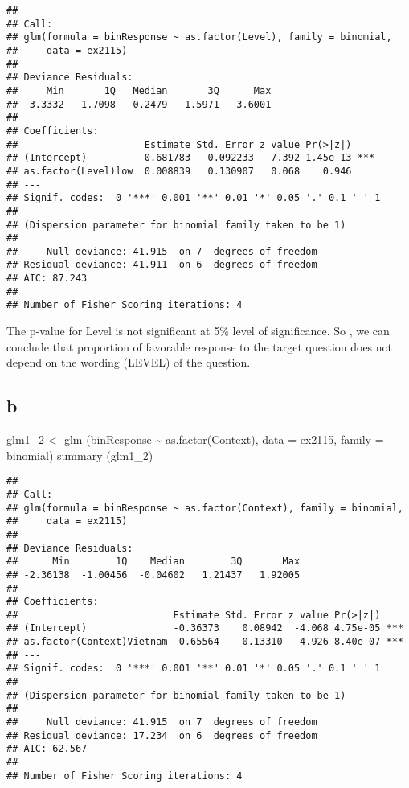 \documentclass[
]{article}
\newenvironment{Shaded}{\begin{snugshade}}{\end{snugshade}}
\newcommand{\AttributeTok}[1]{\textcolor[rgb]{0.77,0.63,0.00}{#1}}
\newcommand{\FunctionTok}[1]{\textcolor[rgb]{0.00,0.00,0.00}{#1}}
\newcommand{\NormalTok}[1]{#1}
\newcommand{\OtherTok}[1]{\textcolor[rgb]{0.56,0.35,0.01}{#1}}
\newcommand{\SpecialCharTok}[1]{\textcolor[rgb]{0.00,0.00,0.00}{#1}}
\begin{document}
\begin{verbatim}
## 
## Call:
## glm(formula = binResponse ~ as.factor(Level), family = binomial, 
##     data = ex2115)
## 
## Deviance Residuals: 
##     Min       1Q   Median       3Q      Max  
## -3.3332  -1.7098  -0.2479   1.5971   3.6001  
## 
## Coefficients:
##                      Estimate Std. Error z value Pr(>|z|)    
## (Intercept)         -0.681783   0.092233  -7.392 1.45e-13 ***
## as.factor(Level)low  0.008839   0.130907   0.068    0.946    
## ---
## Signif. codes:  0 '***' 0.001 '**' 0.01 '*' 0.05 '.' 0.1 ' ' 1
## 
## (Dispersion parameter for binomial family taken to be 1)
## 
##     Null deviance: 41.915  on 7  degrees of freedom
## Residual deviance: 41.911  on 6  degrees of freedom
## AIC: 87.243
## 
## Number of Fisher Scoring iterations: 4
\end{verbatim}

The p-value for Level is not significant at 5\% level of significance.
So , we can conclude that proportion of favorable response to the target
question does not depend on the wording (LEVEL) of the question.

\hypertarget{b}{%
\subsection{b}\label{b}}

\begin{Shaded}
\begin{Highlighting}[]
\NormalTok{glm1\_2 }\OtherTok{\textless{}{-}} \FunctionTok{glm}\NormalTok{ (binResponse }\SpecialCharTok{\textasciitilde{}} \FunctionTok{as.factor}\NormalTok{(Context), }\AttributeTok{data =}\NormalTok{ ex2115, }\AttributeTok{family =}\NormalTok{ binomial)}
\FunctionTok{summary}\NormalTok{ (glm1\_2)}
\end{Highlighting}
\end{Shaded}

\begin{verbatim}
## 
## Call:
## glm(formula = binResponse ~ as.factor(Context), family = binomial, 
##     data = ex2115)
## 
## Deviance Residuals: 
##      Min        1Q    Median        3Q       Max  
## -2.36138  -1.00456  -0.04602   1.21437   1.92005  
## 
## Coefficients:
##                           Estimate Std. Error z value Pr(>|z|)    
## (Intercept)               -0.36373    0.08942  -4.068 4.75e-05 ***
## as.factor(Context)Vietnam -0.65564    0.13310  -4.926 8.40e-07 ***
## ---
## Signif. codes:  0 '***' 0.001 '**' 0.01 '*' 0.05 '.' 0.1 ' ' 1
## 
## (Dispersion parameter for binomial family taken to be 1)
## 
##     Null deviance: 41.915  on 7  degrees of freedom
## Residual deviance: 17.234  on 6  degrees of freedom
## AIC: 62.567
## 
## Number of Fisher Scoring iterations: 4
\end{verbatim}
\end{document}
